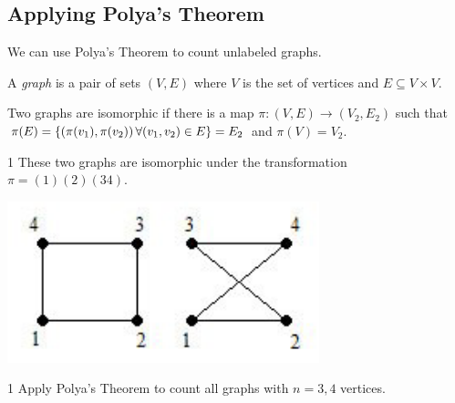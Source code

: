\subsection{Applying Polya's Theorem}
We can use Polya's Theorem to count unlabeled graphs. 

\begin{definition}
    A \emph{graph} is a pair of sets $(V, E)$ where $V$ is the set of vertices
    and $E \subseteq V \times V$. 
\end{definition}

\begin{definition}
    Two graphs are isomorphic if there is a map $\pi : (V, E) \to (V_2, E_2)$
    such that $\pi(E) = \left\{(\pi(v_1), \pi(v_2)) \, \forall (v_1, v_2) \in E\right\} = E_2$
     and $\pi(V) = V_2$. 
\end{definition}

\begin{example}1
    These two graphs are isomorphic under the transformation $\pi = (1)(2)(34)$.
    \begin{center}
        \includegraphics[scale=1]{figures/isomorphic_graphs.png}
    \end{center}
\end{example}

\begin{problem} 1
    Apply Polya's Theorem to count all graphs with $n = 3, 4$ vertices.
\end{problem}

